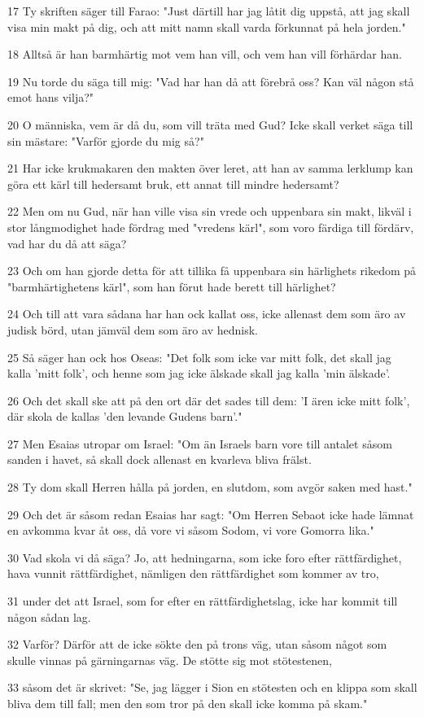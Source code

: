 \par 17 Ty skriften säger till Farao: "Just därtill har jag låtit dig uppstå, att jag skall visa min makt på dig, och att mitt namn skall varda förkunnat på hela jorden."
\par 18 Alltså är han barmhärtig mot vem han vill, och vem han vill förhärdar han.
\par 19 Nu torde du säga till mig: "Vad har han då att förebrå oss? Kan väl någon stå emot hans vilja?"
\par 20 O människa, vem är då du, som vill träta med Gud? Icke skall verket säga till sin mästare: "Varför gjorde du mig så?"
\par 21 Har icke krukmakaren den makten över leret, att han av samma lerklump kan göra ett kärl till hedersamt bruk, ett annat till mindre hedersamt?
\par 22 Men om nu Gud, när han ville visa sin vrede och uppenbara sin makt, likväl i stor långmodighet hade fördrag med "vredens kärl", som voro färdiga till fördärv, vad har du då att säga?
\par 23 Och om han gjorde detta för att tillika få uppenbara sin härlighets rikedom på "barmhärtighetens kärl", som han förut hade berett till härlighet?
\par 24 Och till att vara sådana har han ock kallat oss, icke allenast dem som äro av judisk börd, utan jämväl dem som äro av hednisk.
\par 25 Så säger han ock hos Oseas: "Det folk som icke var mitt folk, det skall jag kalla 'mitt folk', och henne som jag icke älskade skall jag kalla 'min älskade'.
\par 26 Och det skall ske att på den ort där det sades till dem: 'I ären icke mitt folk', där skola de kallas 'den levande Gudens barn'."
\par 27 Men Esaias utropar om Israel: "Om än Israels barn vore till antalet såsom sanden i havet, så skall dock allenast en kvarleva bliva frälst.
\par 28 Ty dom skall Herren hålla på jorden, en slutdom, som avgör saken med hast."
\par 29 Och det är såsom redan Esaias har sagt: "Om Herren Sebaot icke hade lämnat en avkomma kvar åt oss, då vore vi såsom Sodom, vi vore Gomorra lika."
\par 30 Vad skola vi då säga? Jo, att hedningarna, som icke foro efter rättfärdighet, hava vunnit rättfärdighet, nämligen den rättfärdighet som kommer av tro,
\par 31 under det att Israel, som for efter en rättfärdighetslag, icke har kommit till någon sådan lag.
\par 32 Varför? Därför att de icke sökte den på trons väg, utan såsom något som skulle vinnas på gärningarnas väg. De stötte sig mot stötestenen,
\par 33 såsom det är skrivet: "Se, jag lägger i Sion en stötesten och en klippa som skall bliva dem till fall; men den som tror på den skall icke komma på skam."

